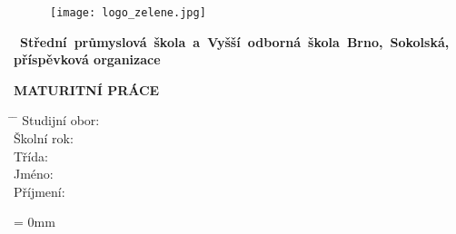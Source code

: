 \begin{titlepage}


\vspace*{-15mm}
\hspace*{-1cm}
\begin{wrapfigure}[3]{l}{.35\textwidth}
		\hspace*{-0.5cm}
		\texttt{[image: logo\_zelene.jpg]}
\end{wrapfigure}

\begin{spacing}{1}
\mbox{ 
\hspace*{-15mm} 
\textbf{Střední průmyslová škola a Vyšší~odborná  škola~Brno,~Sokolská,}
}\\[0.2mm]
\hspace*{-8mm}
\textbf{příspěvková organizace}
\end{spacing}

\vspace*{68mm} 
\begin{center} 
\Huge
\textbf{MATURITNÍ PRÁCE} \\
\vspace{7mm}
\huge %
\textbf{\nazevprace} 
\end{center}

\vfill

\hspace*{10mm}	
\large 
\newcommand{\radkovani}{1mm}
\begin{tabbing}
\hspace{-5mm} \= \hspace{45mm}  \=   \kill %
\>Studijní obor: \> \obor\\[\radkovani ]
\>Školní rok:    \>  \rok          \\[\radkovani]
\>Třída:         \> \trida                \\[\radkovani]
\>Jméno:         \> \textbf{\jmeno}       \\[\radkovani]
\>Příjmení:      \> \textbf{\prijmeni}   \\
\end{tabbing}
\leftskip = 0mm
\normalsize


\end{titlepage}

